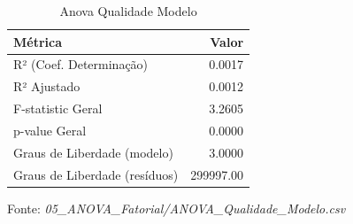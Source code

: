 \begin{table}[H]
\centering
\small
\caption{Anova Qualidade Modelo}
\label{tab:08_05_ANOVA_Fatorial}
\begin{tabular}{|l|r|}
\hline
\textbf{Métrica} & \textbf{Valor} \\
\hline
R² (Coef. Determinação) & 0.0017 \\
R² Ajustado & 0.0012 \\
F-statistic Geral & 3.2605 \\
p-value Geral & 0.0000 \\
Graus de Liberdade (modelo) & 3.0000 \\
Graus de Liberdade (resíduos) & 299997.00 \\
\hline
\end{tabular}
\begin{flushleft}
\small Fonte: \textit{05_ANOVA_Fatorial/ANOVA_Qualidade_Modelo.csv}
\end{flushleft}
\end{table}
